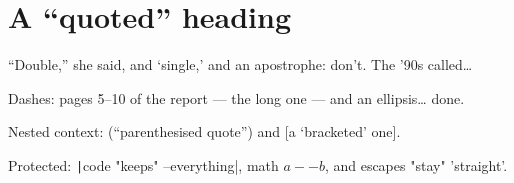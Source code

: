 \section{A “quoted” heading}

“Double,” she said, and ‘single,’ and an apostrophe: don’t. The ’90s called…

Dashes: pages 5–10 of the report — the long one — and an ellipsis… done.

Nested context: (“parenthesised quote”) and [a ‘bracketed’ one].

Protected: \texttt|code "keeps" --everything|, math $a--b$, and escapes "stay" 'straight'.

